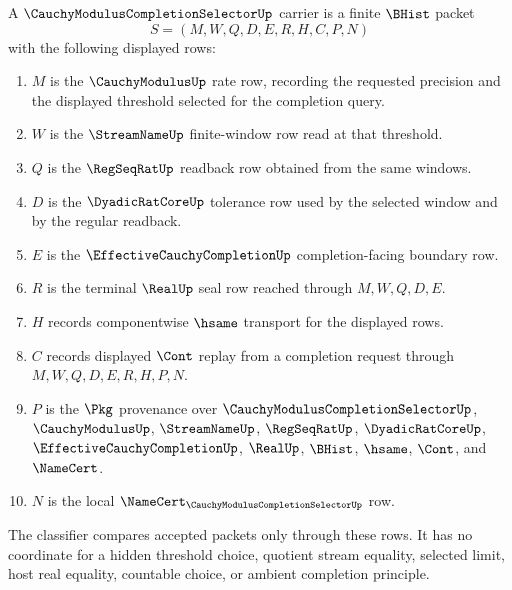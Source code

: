 \begin{definition}\label{def:cauchy-modulus-completion-selector-carrier}
A $\CauchyModulusCompletionSelectorUp$ carrier is a finite $\BHist$ packet
$$
S=(M,W,Q,D,E,R,H,C,P,N)
$$
with the following displayed rows:
\begin{enumerate}
\item $M$ is the $\CauchyModulusUp$ rate row, recording the requested precision
and the displayed threshold selected for the completion query.
\item $W$ is the $\StreamNameUp$ finite-window row read at that threshold.
\item $Q$ is the $\RegSeqRatUp$ readback row obtained from the same windows.
\item $D$ is the $\DyadicRatCoreUp$ tolerance row used by the selected window
and by the regular readback.
\item $E$ is the $\EffectiveCauchyCompletionUp$ completion-facing boundary row.
\item $R$ is the terminal $\RealUp$ seal row reached through $M,W,Q,D,E$.
\item $H$ records componentwise $\hsame$ transport for the displayed rows.
\item $C$ records displayed $\Cont$ replay from a completion request through
$M,W,Q,D,E,R,H,P,N$.
\item $P$ is the $\Pkg$ provenance over
$\CauchyModulusCompletionSelectorUp$, $\CauchyModulusUp$, $\StreamNameUp$,
$\RegSeqRatUp$, $\DyadicRatCoreUp$, $\EffectiveCauchyCompletionUp$, $\RealUp$,
$\BHist$, $\hsame$, $\Cont$, and $\NameCert$.
\item $N$ is the local $\NameCert_{\CauchyModulusCompletionSelectorUp}$ row.
\end{enumerate}
The classifier compares accepted packets only through these rows. It has no
coordinate for a hidden threshold choice, quotient stream equality, selected
limit, host real equality, countable choice, or ambient completion principle.
\end{definition}

